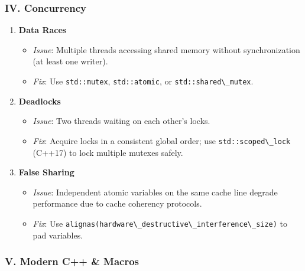 \hypertarget{iv.-concurrency}{%
\subsubsection{IV. Concurrency}\label{iv.-concurrency}}

\begin{enumerate}
\def\labelenumi{\arabic{enumi}.}
\setcounter{enumi}{14}
\tightlist
\item
  \textbf{Data Races}

  \begin{itemize}
  \tightlist
  \item
    \emph{Issue}: Multiple threads accessing shared memory without
    synchronization (at least one writer).
  \item
    \emph{Fix}: Use \passthrough{\lstinline!std::mutex!},
    \passthrough{\lstinline!std::atomic!}, or
    \passthrough{\lstinline!std::shared\_mutex!}.
  \end{itemize}
\item
  \textbf{Deadlocks}

  \begin{itemize}
  \tightlist
  \item
    \emph{Issue}: Two threads waiting on each other's locks.
  \item
    \emph{Fix}: Acquire locks in a consistent global order; use
    \passthrough{\lstinline!std::scoped\_lock!} (C++17) to lock multiple
    mutexes safely.
  \end{itemize}
\item
  \textbf{False Sharing}

  \begin{itemize}
  \tightlist
  \item
    \emph{Issue}: Independent atomic variables on the same cache line
    degrade performance due to cache coherency protocols.
  \item
    \emph{Fix}: Use
    \passthrough{\lstinline!alignas(hardware\_destructive\_interference\_size)!}
    to pad variables.
  \end{itemize}
\end{enumerate}

\hypertarget{v.-modern-c-macros}{%
\subsubsection{V. Modern C++ \& Macros}\label{v.-modern-c-macros}}

